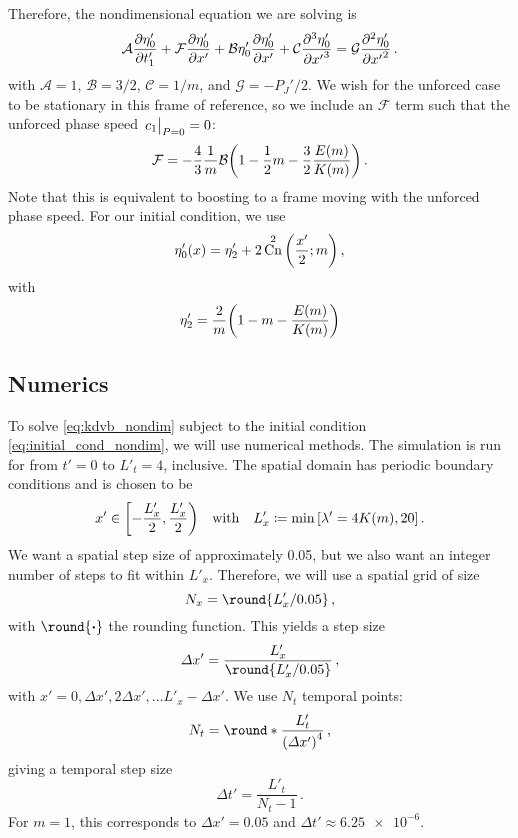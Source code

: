 \documentclass{jfm}
\let\Oldsubsection\subsection
\renewcommand{\subsection}{\FloatBarrier\Oldsubsection}
\DeclareMathOperator{\cn}{Cn}
\DeclarePairedDelimiter{\round}\lfloor\rceil
\begin{document}
Therefore, the nondimensional equation we are solving is
\begin{equation}
  \mathcal{A} \pdv{\eta'_0}{t'_1} + \mathcal{F} \pdv{\eta'_0}{x'} + \mathcal{B}
  \eta'_0 \pdv{\eta'_0}{x'} + \mathcal{C} \pdv[3]{\eta'_0}{{x'}} =
  \mathcal{G} \pdv[2]{\eta'_0}{{x'}} \,.
  \label{eq:kdvb_nondim}
\end{equation}
with $\mathcal{A} = 1$, $\mathcal{B} = 3/2$, $\mathcal{C} = 1/m$, and
$\mathcal{G} = -P_J'/2$.
We wish for the unforced case to be stationary in this frame of
reference, so we include an $\mathcal{F}$ term such that the unforced
phase speed $\eval{c_1}_{P=0} = 0$:
\begin{equation}
  \mathcal{F} = -\frac{4}{3} \frac{1}{m} \mathcal{B}
    \pqty{1 - \frac{1}{2} m - \frac{3}{2} \frac{E(m)}{K(m)}} \,.
\end{equation}
Note that this is equivalent to boosting to a frame moving with the
unforced phase speed.
For our initial condition, we use
\begin{equation}
  \eta'_0(x) = \eta'_2 + 2 \cn^2\pqty{\frac{x'}{2}; m} \,,
  \label{eq:initial_cond_nondim}
\end{equation}
with
\begin{equation}
  \eta'_2 = \frac{2}{m} \pqty{1 - m - \frac{E(m)}{K(m)}}
\end{equation}

\subsection{Numerics}
To solve \cref{eq:kdvb_nondim} subject to the initial condition
\cref{eq:initial_cond_nondim}, we will use numerical methods.
The simulation is run for from $t'= 0$ to $L'_t = 4$, inclusive.
The spatial domain has periodic boundary conditions and is chosen to be
\begin{equation}
  x' \in \biggl[-\frac{L'_x}{2},
    \frac{L'_x}{2} \biggr)
  \qq{with}
  L'_x \coloneqq \min \bqty{\lambda'=4K(m) , 20} \,.
\end{equation}
We want a spatial step size of approximately \num{0.05}, but we also
want an integer number of steps to fit within $L'_x$.
Therefore, we will use a spatial grid of size
\begin{equation}
  N_x = \round{L'_x/0.05} \,,
\end{equation}
with $\round{\vdot}$ the rounding function.
This yields a step size
\begin{equation}
  \Delta x' = \frac{L'_x}
    {\round{L'_x/0.05}} \,,
\end{equation}
with $x' = 0, \Delta x', 2\Delta x', \ldots L'_x - \Delta x'$.
We use $N_t$ temporal points:
\begin{equation}
  N_t =  \round*{\frac{L'_t}{\pqty{\Delta x'}^4}} \,,
\end{equation}
giving a temporal step size
\begin{equation}
  \Delta t' = \frac{L'_t}{N_t -1} \,.
\end{equation}
For $m=1$, this corresponds to $\Delta x' = \num{0.05}$ and $\Delta t'
\approx \num{6.25e-6}$.
\end{document}
